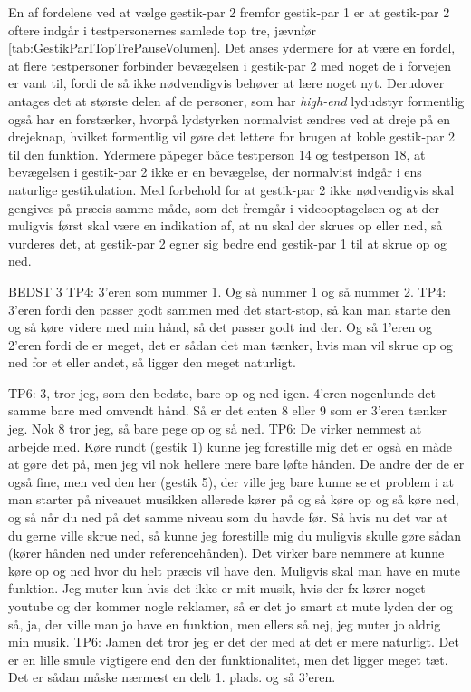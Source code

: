 En af fordelene ved at vælge gestik-par 2 fremfor gestik-par 1 er at gestik-par 2 oftere indgår i testpersonernes samlede top tre, jævnfør \autoref{tab:GestikParITopTrePauseVolumen}. Det anses ydermere for at være en fordel, at flere testpersoner forbinder bevægelsen i gestik-par 2 med noget de i forvejen er vant til, fordi de så ikke nødvendigvis behøver at lære noget nyt. Derudover antages det at største delen af de personer, som har \textit{high-end} lydudstyr formentlig også har en forstærker, hvorpå lydstyrken normalvist ændres ved at dreje på en drejeknap, hvilket formentlig vil gøre det lettere for brugen at koble gestik-par 2 til den funktion. Ydermere påpeger både testperson 14 og testperson 18, at bevægelsen i gestik-par 2 ikke er en bevægelse, der normalvist indgår i ens naturlige gestikulation. Med forbehold for at gestik-par 2 ikke nødvendigvis skal gengives på præcis samme måde, som det fremgår i videooptagelsen og at der muligvis først skal være en indikation af, at nu skal der skrues op eller ned, så vurderes det, at gestik-par 2 egner sig bedre end gestik-par 1 til at skrue op og ned.\blankline
% 
 






BEDST 3
TP4: 3’eren som nummer 1. Og så nummer 1 og så nummer 2.
TP4: 3’eren fordi den passer godt sammen med det start-stop, så kan man starte den og så køre videre med min hånd, så det passer godt ind der. Og så 1’eren og 2’eren fordi de er meget, det er sådan det man tænker, hvis man vil skrue op og ned for et eller andet, så ligger den meget naturligt. 

TP6: 3, tror jeg, som den bedste, bare op og ned igen. 4’eren nogenlunde det samme bare med omvendt hånd. Så er det enten 8 eller 9 som er 3’eren tænker jeg. Nok 8 tror jeg, så bare pege op og så ned. 
TP6: De virker nemmest at arbejde med. Køre rundt (gestik 1) kunne jeg forestille mig det er også en måde at gøre det på, men jeg vil nok hellere mere bare løfte hånden. De andre der de er også fine, men ved den her (gestik 5), der ville jeg bare kunne se et problem i at man starter på niveauet musikken allerede kører på og så køre op og så køre ned, og så når du ned på det samme niveau som du havde før. Så hvis nu det var at du gerne ville skrue ned, så kunne jeg forestille mig du muligvis skulle gøre sådan (kører hånden ned under referencehånden). Det virker bare nemmere at kunne køre op og ned hvor du helt præcis vil have den. Muligvis skal man have en mute funktion. Jeg muter kun hvis det ikke er mit musik, hvis der fx kører noget youtube og der kommer nogle reklamer, så er det jo smart at mute lyden der og så, ja, der ville man jo have en funktion, men ellers så nej, jeg muter jo aldrig min musik. 
TP6: Jamen det tror jeg er det der med at det er mere naturligt. Det er en lille smule vigtigere end den der funktionalitet, men det ligger meget tæt. Det er sådan måske nærmest en delt 1. plads. og så 3’eren.


